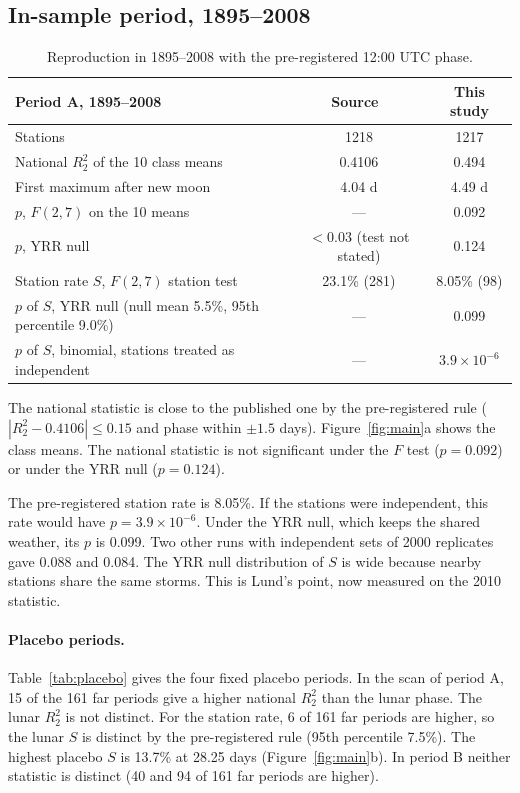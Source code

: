 \documentclass[11pt]{article}
\newcommand{\Rtwo}{R^2_2}
\begin{document}
\subsection{In-sample period, 1895--2008}
\begin{table}[h]
\centering
\small
\begin{tabular}{lcc}
\toprule
Period A, 1895--2008 & Source~\cite{cerveny2010} & This study\\
\midrule
Stations & 1218 & 1217\\
National $\Rtwo$ of the 10 class means & 0.4106 & 0.494\\
First maximum after new moon & 4.04 d & 4.49 d\\
$p$, $F(2,7)$ on the 10 means & --- & 0.092\\
$p$, YRR null & $<0.03$ (test not stated) & 0.124\\
Station rate $S$, $F(2,7)$ station test & 23.1\% (281) & 8.05\% (98)\\
$p$ of $S$, YRR null (null mean 5.5\%, 95th percentile 9.0\%) & --- & 0.099\\
$p$ of $S$, binomial, stations treated as independent & --- & $3.9\times10^{-6}$\\
\bottomrule
\end{tabular}
\caption{Reproduction in 1895--2008 with the pre-registered 12:00 UTC phase.}
\label{tab:A}
\end{table}

The national statistic is close to the published one by the pre-registered rule ($|\Rtwo-0.4106|\le0.15$ and phase within $\pm1.5$ days). Figure~\ref{fig:main}a shows the class means. The national statistic is not significant under the $F$ test ($p=0.092$) or under the YRR null ($p=0.124$).

The pre-registered station rate is 8.05\%. If the stations were independent, this rate would have $p=3.9\times10^{-6}$. Under the YRR null, which keeps the shared weather, its $p$ is 0.099. Two other runs with independent sets of 2000 replicates gave 0.088 and 0.084. The YRR null distribution of $S$ is wide because nearby stations share the same storms. This is Lund's point, now measured on the 2010 statistic.

\paragraph{Placebo periods.} Table~\ref{tab:placebo} gives the four fixed placebo periods. In the scan of period A, 15 of the 161 far periods give a higher national $\Rtwo$ than the lunar phase. The lunar $\Rtwo$ is not distinct. For the station rate, 6 of 161 far periods are higher, so the lunar $S$ is distinct by the pre-registered rule (95th percentile 7.5\%). The highest placebo $S$ is 13.7\% at 28.25 days (Figure~\ref{fig:main}b). In period B neither statistic is distinct (40 and 94 of 161 far periods are higher).
\end{document}

